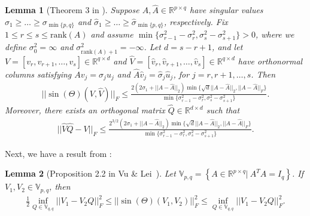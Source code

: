 \documentclass{article}
\newtheorem{lemma}{Lemma}
\begin{document}
\begin{lemma}[Theorem 3 in \cite{YuEtal15}]
\label{lemma:thm3YuEtal}
Suppose $A, \hat{A} \in \mathbb{R}^{p \times q}$ have singular values $\sigma_1 \geq \dots \geq \sigma_{\min\{p, q\}}$ and $\hat{\sigma}_1 \geq \dots \geq \hat{\sigma}_{\min\{p, q\}}$, respectively. Fix $1 \leq r \leq s \leq \mathrm{rank}(A)$ and assume $\min\{\sigma_{r - 1}^2 - \sigma_r^2, \sigma_s^2 - \sigma_{s + 1}^2\} > 0$, where we define $\sigma_0^2 = \infty$ and $\sigma_{\mathrm{rank}(A) + 1}^2 = -\infty$. Let $d = s - r + 1$, and let $V = [v_r, v_{r + 1}, \dots, v_s] \in \mathbb{R}^{q \times d}$ and $\hat{V} = [\hat{v}_r, \hat{v}_{r + 1}, \dots, \hat{v}_s] \in \mathbb{R}^{q \times d}$ have orthonormal columns satisfying $Av_j = \sigma_ju_j$ and $\hat{A}\hat{v}_j = \hat{\sigma}_j\hat{u}_j$, for $j = r, r + 1, \dots, s$. Then
\begin{align*}
||\sin(\Theta)(V, \hat{V})||_F \leq \frac{2\left(2\sigma_1 + ||A - \hat{A}||_2\right)\min\{\sqrt{d}||A - \hat{A}||_2, ||A - \hat{A}||_F\}}{\min\{\sigma_{r - 1}^2 - \sigma_r^2, \sigma_s^2 - \sigma_{s + 1}^2\}}.
\end{align*}
Moreover, there exists an orthogonal matrix $\hat{Q} \in \mathbb{R}^{d \times d}$ such that
\begin{align*}
||\hat{V}\hat{Q} - V||_F \leq \frac{2^{3/2}\left(2\sigma_1 + ||A - \hat{A}||_2\right)\min\{\sqrt{d}||A - \hat{A}||_2, ||A - \hat{A}||_F\}}{\min\{\sigma_{r - 1}^2 - \sigma_r^2, \sigma_s^2 - \sigma_{s + 1}^2\}}.
\end{align*}
\end{lemma}

Next, we have a result from \cite{VuLei13}:

\begin{lemma}[Proposition 2.2 in Vu \& Lei~\cite{VuLei13}]
\label{lemma:prop2.2VuLei}
Let $\mathbb{V}_{p, q} = \left\{A \in \mathbb{R}^{p \times q}| \ A^TA = I_q\right\}$. If $V_1, V_2 \in \mathbb{V}_{p, q}$, then
\begin{align*}
\frac{1}{2}\inf\limits_{Q \in \mathbb{V}_{q, q}}||V_1 - V_2Q||_F^2 \leq ||\sin(\Theta)(V_1, V_2)||_F^2 \leq \inf\limits_{Q \in \mathbb{V}_{q, q}}||V_1 - V_2Q||_F^2.
\end{align*}
\end{lemma}


\end{document}
